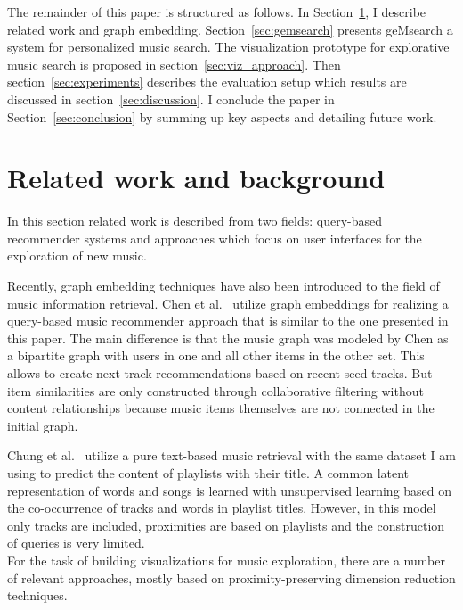 \documentclass[sigconf]{acmart}
\begin{document}
The remainder of this paper is structured as follows. In Section~\ref{sec:relwork}, I describe related work and graph embedding. Section~\ref{sec:gemsearch} presents geMsearch a system for personalized music search. The visualization prototype for  explorative music search is proposed in section~\ref{sec:viz_approach}. Then section~\ref{sec:experiments} describes the evaluation setup which results are discussed in section~\ref{sec:discussion}. I conclude the paper in Section~\ref{sec:conclusion} by summing up key aspects and detailing future work.

\section{Related work and background}
\label{sec:relwork}

In this section related work is described from two fields: query-based recommender systems and approaches which focus on user interfaces for the exploration of new music. 

Recently, graph embedding techniques have also been introduced to the field of music information retrieval. Chen et al.~\cite{Chen:2016:QMR:2959100.2959169} utilize graph embeddings for realizing a query-based music recommender approach that is similar to the one presented in this paper. The main difference is that the music graph was modeled by Chen as a bipartite graph with users in one and all other items in the other set. This allows to create next track recommendations based on recent seed tracks. But item similarities are only constructed through collaborative filtering without content relationships because music items themselves are not connected in the initial graph. 

Chung et al.~\cite{chungexploiting} utilize a pure text-based music retrieval with the same dataset I am using to predict the content of playlists with their title. A common latent representation of words and songs is learned with unsupervised learning based on the co-occurrence of tracks and words in playlist titles. However, in this model only tracks are included, proximities are based on playlists and the construction of queries is very limited. \\


For the task of building visualizations for music exploration, there are a number of relevant approaches, mostly based on proximity-preserving dimension reduction techniques. 
\end{document}
